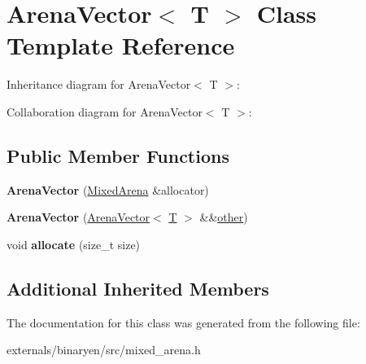 \hypertarget{class_arena_vector}{}\section{Arena\+Vector$<$ T $>$ Class Template Reference}
\label{class_arena_vector}


Inheritance diagram for Arena\+Vector$<$ T $>$\+:


Collaboration diagram for Arena\+Vector$<$ T $>$\+:
\subsection*{Public Member Functions}
\begin{DoxyCompactItemize}
\item 
\mbox{\label{class_arena_vector_afd00b5faa695e3dd3c1a33a37da2a853}} 
{\bfseries Arena\+Vector} (\mbox{\hyperlink{struct_mixed_arena}{Mixed\+Arena}} \&allocator)
\item 
\mbox{\label{class_arena_vector_af430ea5da68f9a95cd0c9cc5083a8c62}} 
{\bfseries Arena\+Vector} (\mbox{\hyperlink{class_arena_vector}{Arena\+Vector}}$<$ \mbox{\hyperlink{struct_t}{T}} $>$ \&\&\mbox{\hyperlink{structother}{other}})
\item 
\mbox{\label{class_arena_vector_a13b16c79adc81bdaeeb403035e215b9a}} 
void {\bfseries allocate} (size\+\_\+t size)
\end{DoxyCompactItemize}
\subsection*{Additional Inherited Members}


The documentation for this class was generated from the following file\+:\begin{DoxyCompactItemize}
\item 
externals/binaryen/src/mixed\+\_\+arena.\+h\end{DoxyCompactItemize}
